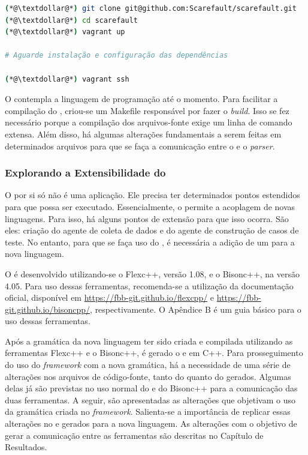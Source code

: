 \begin{lstlisting}[language=bash, label=ambiente-virtual, caption=Levantamento do ambiente de desenvolvimento]
(*@\textdollar@*) git clone git@github.com:Scarefault/scarefault.git
(*@\textdollar@*) cd scarefault
(*@\textdollar@*) vagrant up

# Aguarde instalação e configuração das dependências

(*@\textdollar@*) vagrant ssh
\end{lstlisting}

O \scarefault contempla a linguagem de programação \grails até o momento.
Para facilitar a compilação do \Scarefault, criou-se um \textsf{Makefile}
responsável por fazer o \textit{build}. Isso se fez necessário porque a
compilação dos arquivos-fonte exige um linha de comando extensa. Além disso,
há algumas alterações fundamentais a serem feitas em determinados arquivos
para que se faça a comunicação entre o \scanner e o \textit{parser}.

\subsubsection{Explorando a Extensibilidade do \Scarefault}
O \scarefault por si só não é uma aplicação. Ele precisa ter determinados pontos
estendidos para que possa ser executado. Essencialmente, o \scarefault permite a
acoplagem de novas linguagens. Para isso, há alguns pontos de extensão para que
isso ocorra. São eles: criação do agente de coleta de dados e do agente de
construção de casos de teste. No entanto, para que se faça uso do \Scarefault, é
necessária a adição de um \parser para a nova linguagem.

O \parser é desenvolvido utilizando-se o \textsf{Flexc++}, versão 1.08, e o \textsf{Bisonc++}, na versão 4.05. Para
uso dessas ferramentas, recomenda-se a utilização da documentação oficial, disponível
em \url{https://fbb-git.github.io/flexcpp/} e \url{https://fbb-git.github.io/bisoncpp/},
respectivamente. O Apêndice B é um guia básico para o uso dessas ferramentas.

Após a gramática da nova linguagem ter sido criada e compilada utilizando as ferramentas \textsf{Flexc++} e o \textsf{Bisonc++}, é gerado o \parser e \scanner em C++. Para prosseguimento do uso do \textit{framework} com a nova gramática, há a necessidade de
uma série de alterações nos arquivos de código-fonte, tanto do \parser quanto do
\scanner gerados. Algumas delas já são previstas no uso normal do \flexcpp e do
\textsf{Bisonc++} para a comunicação das duas ferramentas. A seguir, são apresentadas as alterações que objetivam o uso da gramática criada no \textit{framework}. Salienta-se a importância de replicar essas alterações no \parser e \scanner gerados para a nova linguagem. As alterações com o
objetivo de gerar a comunicação entre as ferramentas são descritas no Capítulo de
Resultados.  

